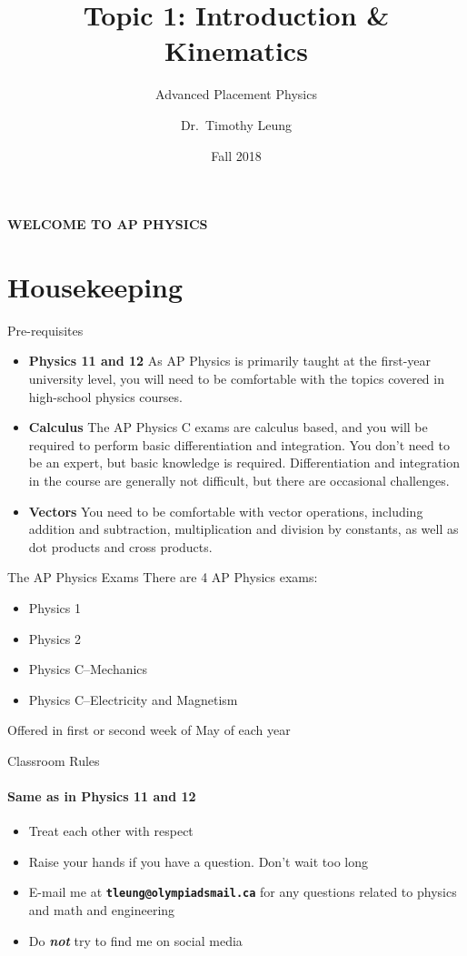 \documentclass[12pt,compress,aspectratio=169]{beamer}
\title{Topic 1: Introduction \& Kinematics} %
\subtitle{Advanced Placement Physics}
\author[TML]{Dr.\ Timothy Leung}
\institute{Olympiads School}
\date{Fall 2018}
\begin{document}
\begin{frame}
  \frametitle{}
  {\LARGE
    \begin{center}
      \textbf{WELCOME TO AP PHYSICS}
    \end{center}
  }
\end{frame}


\section{Housekeeping}


\begin{frame}{Pre-requisites}
  \begin{itemize}
  \item\textbf{Physics 11 and 12} As AP Physics is primarily taught at the
    first-year university level, you will need to be comfortable with the
    topics covered in high-school physics courses.
  \item\textbf{Calculus} The AP Physics C exams are calculus based, and you
    will be required to perform basic differentiation and integration. You
    don't need to be an expert, but basic knowledge is required.
    Differentiation and integration in the course are generally not
    difficult, but there are occasional challenges.
  \item\textbf{Vectors} You need to be comfortable with vector operations,
    including addition and subtraction, multiplication and division by
    constants, as well as dot products and cross products.
  \end{itemize}
\end{frame}



\begin{frame}{The AP Physics Exams}
  There are 4 AP Physics exams:
  \begin{itemize}
  \item Physics 1
  \item Physics 2
  \item Physics C--Mechanics
  \item Physics C--Electricity and Magnetism
  \end{itemize}
  Offered in first or second week of May of each year
\end{frame}



\begin{frame}{Classroom Rules}
  \framesubtitle{Same as in Physics 11 and 12}
  \begin{itemize}
  \item Treat each other with respect
  \item Raise your hands if you have a question. Don't wait too long
  \item E-mail me at \textbf{\texttt{tleung@olympiadsmail.ca}} for any questions
    related to physics and math and engineering
  \item Do \textbf{\emph{not}} try to find me on social media
  \end{itemize}
\end{frame}
\end{document}
